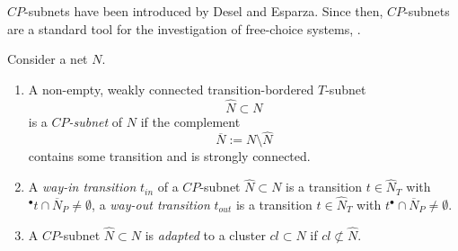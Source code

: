 \documentclass{fundam}
\begin{document}
$CP$-subnets have been introduced by Desel and Esparza. Since then, $CP$-subnets are a standard tool for the investigation of free-choice systems, \cite[Def. 7.7, Theor. 7.13]{DE1995}.
\begin{definition}[$CP$-subnet]\label{def_cpsubnet}
Consider a net $N$.
\begin{enumerate}
\item A non-empty, weakly connected transition-bordered $T$-subnet
$$\hat{N} \subset N$$
is a \emph{$CP$-subnet} of $N$ if the complement
$$\overline{N}:=N \setminus \hat{N}$$
contains some transition and is strongly connected.
\item A \emph{way-in transition} $t_{in}$ of a $CP$-subnet $\hat{N} \subset N$ is a transition $t \in \hat{N}_T$ with
        $^\bullet t \cap \overline{N}_P \neq \emptyset$,
        a    \emph{way-out transition} $t_{out}$ is a transition $t \in \hat{N}_T$ with $t^\bullet \cap \overline{N}_P \neq \emptyset$.
   \eject
\item A $CP$-subnet $\hat{N} \subset N$ is \emph{adapted} to a cluster $cl \subset N$ if $cl \not\subset \hat{N}$.
\end{enumerate}
\end{definition}
\end{document}
